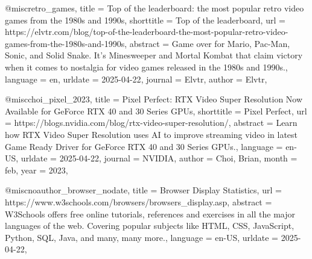 {@misc{retro_games,
	title = {Top of the leaderboard: the most popular retro video games from the 1980s and 1990s},
	shorttitle = {Top of the leaderboard},
	url = {https://elvtr.com/blog/top-of-the-leaderboard-the-most-popular-retro-video-games-from-the-1980s-and-1990s},
	abstract = {Game over for Mario, Pac-Man, Sonic, and Solid Snake. It’s Minesweeper and Mortal Kombat that claim victory when it comes to nostalgia for video games released in the 1980s and 1990s.},
	language = {en},
	urldate = {2025-04-22},
	journal = {Elvtr},
	author = {{Elvtr}},
}

@misc{choi_pixel_2023,
	title = {Pixel {Perfect}: {RTX} {Video} {Super} {Resolution} {Now} {Available} for {GeForce} {RTX} 40 and 30 {Series} {GPUs}},
	shorttitle = {Pixel {Perfect}},
	url = {https://blogs.nvidia.com/blog/rtx-video-super-resolution/},
	abstract = {Learn how RTX Video Super Resolution uses AI to improve streaming video in latest Game Ready Driver for GeForce RTX 40 and 30 Series GPUs.},
	language = {en-US},
	urldate = {2025-04-22},
	journal = {NVIDIA},
	author = {Choi, Brian},
	month = feb,
	year = {2023},
}

@misc{noauthor_browser_nodate,
	title = {Browser {Display} {Statistics}},
	url = {https://www.w3schools.com/browsers/browsers_display.asp},
	abstract = {W3Schools offers free online tutorials, references and exercises in all the major languages of the web. Covering popular subjects like HTML, CSS, JavaScript, Python, SQL, Java, and many, many more.},
	language = {en-US},
	urldate = {2025-04-22},
}

}
